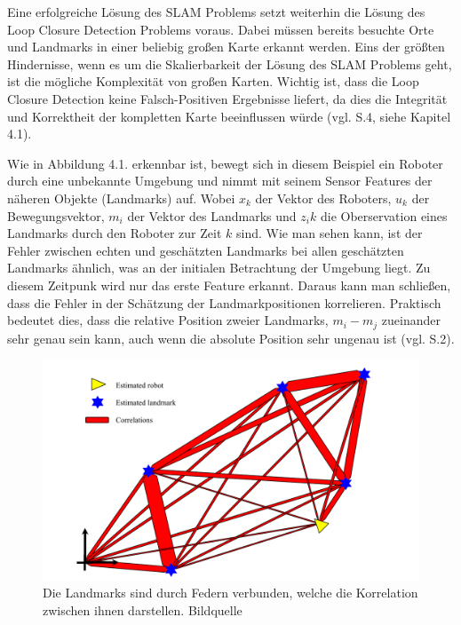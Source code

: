 Eine erfolgreiche Lösung des SLAM Problems setzt weiterhin die Lösung des \glqq Loop Closure Detection\grqq{} Problems voraus. Dabei müssen bereits besuchte Orte und Landmarks in einer beliebig großen Karte erkannt werden. Eins der größten Hindernisse, wenn es um die Skalierbarkeit der Lösung des SLAM Problems geht, ist die mögliche Komplexität von großen Karten. Wichtig ist, dass die Loop Closure Detection keine Falsch-Positiven Ergebnisse liefert, da dies die Integrität und Korrektheit der kompletten Karte beeinflussen würde (vgl. \cite{ar_slam} S.4, siehe Kapitel 4.1).

Wie in Abbildung 4.1. erkennbar ist, bewegt sich in diesem Beispiel ein Roboter durch eine unbekannte Umgebung und nimmt mit seinem Sensor Features der näheren Objekte (Landmarks) auf. Wobei $x_k$ der Vektor des Roboters,  $u_k$ der Bewegungsvektor, $m_i$ der Vektor des Landmarks und $z_ik$ die Oberservation eines Landmarks durch den Roboter zur Zeit $k$ sind. Wie man sehen kann, ist der Fehler zwischen echten und geschätzten Landmarks bei allen geschätzten Landmarks ähnlich, was an der initialen Betrachtung der Umgebung liegt. Zu diesem Zeitpunk wird nur das erste Feature erkannt. Daraus kann man schließen, dass die Fehler in der Schätzung der Landmarkpositionen korrelieren. Praktisch bedeutet dies, dass die relative Position zweier Landmarks, $m_i - m_j$ zueinander sehr genau sein kann, auch wenn die absolute Position sehr ungenau ist (vgl. \cite{slam} S.2).

\begin{figure}[H]
	\centering
	\includegraphics[scale=0.6]{slam_springs.png}
	\caption{Die Landmarks sind durch \glqq Federn\grqq{} verbunden, welche die Korrelation zwischen ihnen darstellen.  Bildquelle \cite{slam}}
\end{figure}  


